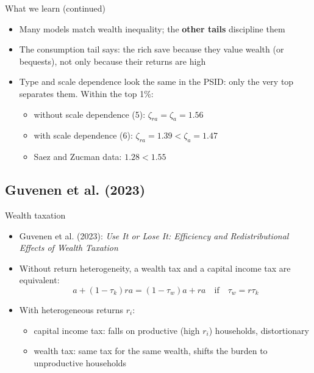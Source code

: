 \documentclass[10pt,english,10pt,handout]{beamer}
\begin{document}
\begin{frame}{What we learn (continued)}
\begin{itemize}
\item Many models match wealth inequality; the \textbf{other tails} discipline them
\item The consumption tail says: the rich save because they value wealth (or bequests), not only because their returns are high
\item Type and scale dependence look the same in the PSID: only the very top separates them. Within the top 1\%:
\begin{itemize}
\item without scale dependence (5): $\zeta_{ra}=\zeta_{a}=1.56$
\item with scale dependence (6): $\zeta_{ra}=1.39<\zeta_{a}=1.47$
\item Saez and Zucman data: $1.28<1.55$
\end{itemize}
\end{itemize}
\end{frame}

\subsection{Guvenen et al. (2023)}

\begin{frame}{Wealth taxation}
\begin{itemize}
\item Guvenen et al. (2023): \emph{Use It or Lose It: Efficiency and Redistributional Effects of Wealth Taxation}
\item Without return heterogeneity, a wealth tax and a capital income tax are equivalent:
\[
a+(1-\tau_{k})ra=(1-\tau_{w})a+ra\quad\text{if}\quad\tau_{w}=r\tau_{k}
\]
\item With heterogeneous returns $r_{i}$:
\begin{itemize}
\item capital income tax: falls on productive (high $r_{i}$) households, distortionary
\item wealth tax: same tax for the same wealth, shifts the burden to unproductive households
\end{itemize}
\end{itemize}
\end{frame}
\end{document}
